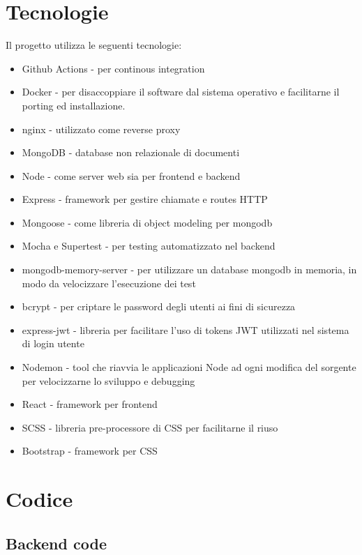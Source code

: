 \documentclass{report}
\begin{document}
\section{Tecnologie}
Il progetto utilizza le seguenti tecnologie:
\begin{itemize}
    \item Github Actions - per continous integration
    \item Docker - per disaccoppiare il software dal sistema operativo e facilitarne il porting ed installazione.
    \item nginx - utilizzato come reverse proxy
    \item MongoDB - database non relazionale di documenti
    \item Node - come server web sia per frontend e backend
    \item Express - framework per gestire chiamate e routes HTTP
    \item Mongoose - come libreria di object modeling per mongodb
    \item Mocha e Supertest - per testing automatizzato nel backend
    \item mongodb-memory-server - per utilizzare un database mongodb in memoria, in modo da velocizzare l'esecuzione dei test
    \item bcrypt - per criptare le password degli utenti ai fini di sicurezza
    \item express-jwt - libreria per facilitare l'uso di tokens JWT utilizzati nel sistema di login utente
    \item Nodemon - tool che riavvia le applicazioni Node ad ogni modifica del sorgente
    per velocizzarne lo sviluppo e debugging
    \item React - framework per frontend
    \item SCSS - libreria pre-processore di CSS per facilitarne il riuso
    \item Bootstrap - framework per CSS
\end{itemize}

\section{Codice}
\subsection{Backend code}
\end{document}
